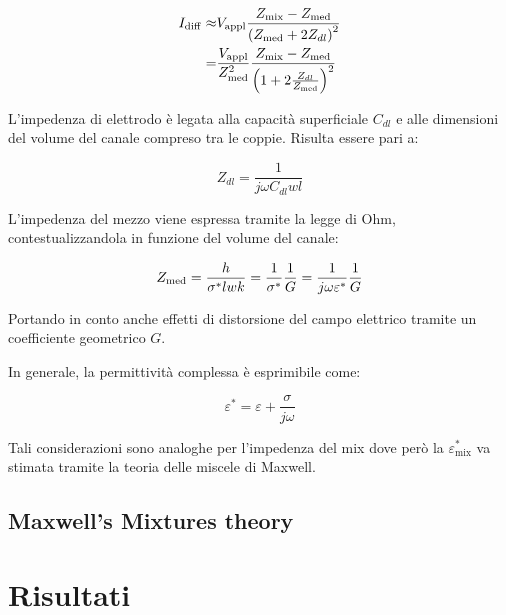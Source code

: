\begin{equation}
\begin{aligned}
	I_{\operatorname{d i f f}}\approx &V_{\operatorname{a p p l}}\frac{Z_{\operatorname{m i x}} -Z_{\operatorname{m e d}}}{\left(Z_{\operatorname{m e d}} +2Z_{dl}\right)^2}\\
	=&  {V_{\operatorname{a p p l}}\over Z_{\operatorname{m e d}}^2} \frac{Z_{\operatorname{m i x}} -Z_{\operatorname{m e d}}}{\left(1+ 2{Z_{dl}\over Z_{\operatorname{m e d}} }\right)^2}
\end{aligned}
\end{equation}

L'impedenza di elettrodo è legata alla capacità superficiale $C_{dl}$ e alle dimensioni del volume del canale compreso tra le coppie. Risulta essere pari a:

\begin{equation}
	Z_{d l}=\frac{1}{j \omega C_{d l} w l}
\end{equation}

L'impedenza del mezzo viene espressa tramite la legge di Ohm, contestualizzandola in funzione del volume del canale:

\begin{equation}
	Z_{\operatorname{m e d}}=\frac{h}{\sigma^{*} l w k}={1\over \sigma^*}{1\over G}={1\over j\omega \varepsilon ^*}{1\over G}
\end{equation}

Portando in conto anche effetti di distorsione del campo elettrico tramite un coefficiente geometrico $G$. 

In generale, la permittività complessa è esprimibile come:

\begin{equation}
	\varepsilon^{*}=\varepsilon+\frac{\sigma}{j \omega}
\end{equation}

Tali considerazioni sono analoghe per l'impedenza del mix dove però la $\varepsilon^*_{\operatorname{m i x}}$ va stimata tramite la teoria delle miscele di Maxwell. 

\subsection{Maxwell's Mixtures theory}



\textcolor{blue}{\lipsum[1-4]}



\section{Risultati}


